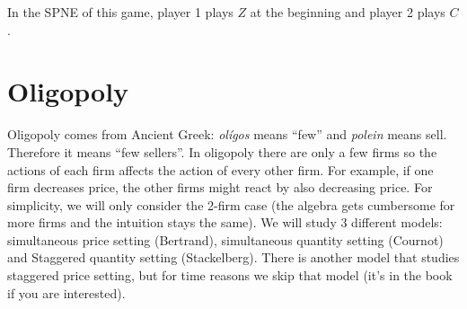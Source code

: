 \documentclass{article}
\begin{document}
\begin{center}
\end{center}
In the SPNE of this game, player 1 plays $Z$ at the beginning and player 2 plays $C$.

\section{Oligopoly}
Oligopoly comes from Ancient Greek: \emph{olígos} means ``few'' and \emph{polein} means sell. Therefore it means ``few sellers''. In oligopoly there are only a few firms so the actions of each firm affects the action of every other firm. For example, if one firm decreases price, the other firms might react by also decreasing price. For simplicity, we will only consider the 2-firm case (the algebra gets cumbersome for more firms and the intuition stays the same). We will study 3 different models: simultaneous price setting (Bertrand), simultaneous quantity setting (Cournot) and Staggered quantity setting (Stackelberg). There is another model that studies staggered price setting, but for time reasons we skip that model (it's in the book if you are interested).
\end{document}
